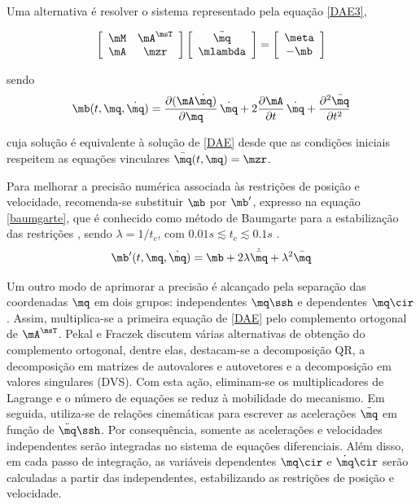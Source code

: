 \documentclass[]{politex}
\begin{document}
Uma alternativa é resolver o sistema representado pela equação \eqref{DAE3}, 

\begin{equation}
\left[ \begin{array}{cc}
\mM & \mA^\msT \\
\mA & \mzr
\end{array}
\right]
\left[ \begin{array}{c}
\ddot{\mq} \\
\mlambda
\end{array}
\right] =
\left[ \begin{array}{c}
\meta \\
-\mb
\end{array}
\right]
\label{DAE3}
\end{equation}

\vspace{0.5cm}

sendo
\begin{equation}
\mb(t,\mq,\dot{\mq}) = \frac{\partial (\mA \dot{\mq})}{\partial \mq} \, \dot{\mq} + 2 \frac{\partial \mA}{\partial t} \, \dot{\mq} + \frac{\partial^2 \bar{\mq}}{\partial t^2}
\end{equation}

cuja solução é equivalente à solução de \eqref{DAE} desde que as condições iniciais respeitem as equações vinculares $\bar{\mq}(t, \mq) = \mzr$.

Para melhorar a precisão numérica associada às restrições de posição e velocidade, recomenda-se substituir $\mb$ por $\mb'$, expresso na equação \eqref{baumgarte}, que é conhecido como método de Baumgarte para a estabilização das restrições \cite{Baumgarte, Featherstone, Nikravesh}, sendo $\lambda = 1/t_c$, com \linebreak  $0.01s \lesssim t_c \lesssim 0.1s $ \cite{Featherstone}. 
%
\begin{equation}
\mb'(t,\mq,\dot{\mq}) = \mb + 2\lambda \dot{\bar{\mq}} + \lambda^2 \bar{\mq}
\label{baumgarte}
\end{equation}


Um outro modo de aprimorar a precisão é alcançado pela separação das coordenadas $\mq$ em dois grupos: independentes $\mq\ssh$ e dependentes $\mq\cir$. Assim, multiplica-se a primeira equação de \eqref{DAE} pelo complemento ortogonal \cite{Kordjazi} de $\mA^\msT$. Pekal e Fraczek \cite{Pekal} discutem várias alternativas de obtenção do complemento ortogonal, dentre elas, destacam-se a decomposição QR, a decomposição em matrizes de autovalores e autovetores e a decomposição em valores singulares (DVS). Com esta ação, eliminam-se os multiplicadores de Lagrange e o número de equações se reduz à mobilidade do mecanismo. Em seguida, utiliza-se de relações cinemáticas para  escrever as acelerações $\ddot{\mq}$ em função de $\ddot{\mq}\ssh$. Por consequência, somente as acelerações e velocidades independentes serão integradas no sistema de equações diferenciais. Além disso, em cada passo de integração, as variáveis dependentes $\mq\cir$ e $\dot{\mq}\cir$ serão calculadas a partir das independentes, estabilizando as restrições de posição e velocidade.
\end{document}
